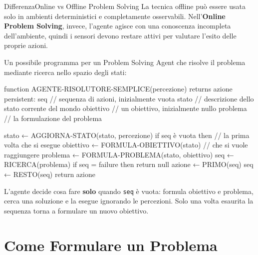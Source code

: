 \documentclass[a4paper, 11pt, oneside]{book}
\theoremstyle{definition}
\begin{document}
	\begin{nota}
		{Differenza}{Online vs Offline Problem Solving} La tecnica offline pu\`o essere
		usata solo in ambienti deterministici e completamente osservabili. Nell'\textbf{Online
		Problem Solving}, invece, l'agente agisce con una conoscenza incompleta
		dell'ambiente, quindi i sensori devono restare attivi per valutare l'esito delle
		proprie azioni.
	\end{nota}

	Un possibile programma per un Problem Solving Agent che risolve il problema mediante
	ricerca nello spazio degli stati:

\begin{codice}
function AGENTE-RISOLUTORE-SEMPLICE(percezione) returns azione
    persistent:
        seq         // sequenza di azioni, inizialmente vuota
        stato       // descrizione dello stato corrente del mondo
        obiettivo   // un obiettivo, inizialmente nullo
        problema    // la formulazione del problema

    stato ← AGGIORNA-STATO(stato, percezione)
    if seq è vuota then // la prima volta che si esegue
        obiettivo ← FORMULA-OBIETTIVO(stato) // che si vuole raggiungere
        problema ← FORMULA-PROBLEMA(stato, obiettivo) 
        seq ← RICERCA(problema)
        if seq = failure then return null
    azione ← PRIMO(seq)
    seq ← RESTO(seq)
    return azione
\end{codice}

	L'agente decide cosa fare \textbf{solo} quando \texttt{seq} \`e vuota: formula
	obiettivo e problema, cerca una soluzione e la esegue ignorando le percezioni. Solo
	una volta esaurita la sequenza torna a formulare un nuovo obiettivo.

	\section{Come Formulare un Problema}
\end{document}

